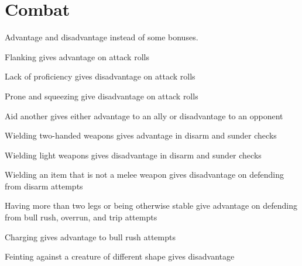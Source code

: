 \section{Combat}
\begin{itemize*}
	\item Advantage and disadvantage instead of some bonuses.
	\begin{itemize*}
		\item Flanking gives advantage on attack rolls
		\item Lack of proficiency gives disadvantage on attack rolls
		\item Prone and squeezing give disadvantage on attack rolls
		\item Aid another gives either advantage to an ally or disadvantage to an opponent
		\item Wielding two-handed weapons gives advantage in disarm and sunder checks
		\item Wielding light weapons gives disadvantage in disarm and sunder checks
		\item Wielding an item that is not a melee weapon gives disadvantage on defending from disarm attempts
		\item Having more than two legs or being otherwise stable give advantage on defending from bull rush, overrun, and trip attempts
		\item Charging gives advantage to bull rush attempts
		\item Feinting against a creature of different shape gives disadvantage
	\end{itemize*}
\end{itemize*}


